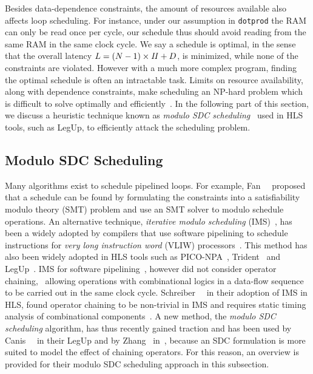 Besides data-dependence constraints, the amount of resources available also
affects loop scheduling.  For instance, under our assumption in \verb|dotprod|
the RAM can only be read once per cycle, our schedule thus should avoid
reading from the same RAM in the same clock cycle.  We say a schedule is
optimal, in the sense that the overall latency $L = (N - 1) \times \mathit{II} + D$,
is minimized, while none of the constraints are violated.  However with a much
more complex program, finding the optimal schedule is often an intractable
task.  Limits on resource availability, along with dependence constraints,
make scheduling an NP-hard problem which is difficult to solve optimally and
efficiently~\cite{hwang91}.  In the following part of this section, we discuss
a heuristic technique known as \emph{modulo SDC scheduling}~\cite{zhang13,
canis14} used in HLS tools, such as LegUp, to efficiently attack the scheduling
problem.


\subsection{Modulo SDC Scheduling}
\label{bg:sub:sdc}

Many algorithms exist to schedule pipelined loops.  For example,
Fan~\etal~\cite{fan08} proposed that a schedule can be found by formulating
the constraints into a satisfiability modulo theory (SMT) problem
and use an SMT solver to modulo schedule operations.  An alternative
technique, \emph{iterative modulo scheduling} (IMS)~\cite{rau94}, has
been a widely adopted by compilers that use software pipelining to
schedule instructions for \emph{very long instruction word} (VLIW)
processors~\cite{mcnairy03}.  This method has also been widely adopted in
HLS tools such as PICO-NPA~\cite{schreiber02}, Trident~\cite{tripp05} and
LegUp~\cite{canis13, canis14}.  IMS for software pipelining~\cite{rau94},
however did not consider operator chaining, \ie~allowing operations with
combinational logics in a data-flow sequence to be carried out in the same
clock cycle.  Schreiber~\etal~\cite{schreiber02} in their adoption of IMS in
HLS, found operator chaining to be non-trivial in IMS and requires static
timing analysis of combinational components~\cite{canis14}.  A new method, the
\emph{modulo SDC scheduling} algorithm, has thus recently gained traction and
has been used by Canis~\etal~\cite{canis14} in their LegUp and by Zhang~\etal
in~\cite{zhang13}, because an SDC formulation is more suited to model the
effect of chaining operators.  For this reason, an overview is provided for
their modulo SDC scheduling approach in this subsection.


